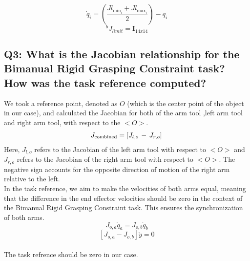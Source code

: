 \documentclass{article}
\begin{document}
\[
\dot{q}_i = \left(\frac{Jl_{\text{min}_i} + Jl_{\text{max}_i}}{2}\right) - q_i
\]
$${}^{b}J_{limit} =  \mathbf{I}_{14x14}$$

\subsection{Q3: What is the Jacobian relationship for the Bimanual Rigid Grasping Constraint task? How was the task reference computed?}

We took a reference point, denoted as  \( \mathit{O} \) (which is the center point of the object in our case), and calculated the Jacobian for both of the arm tool ,left arm tool and right arm tool, with respect to the  \( \mathit{<O>} \). \\
\[
J_{\text{combined}} = \left[ J_{l,o} \, - \, J_{r,o} \right]\\
\]
\noindent
Here, $J_{l,o}$ refers to the Jacobian of the left arm tool with respect to \( \mathit{<O>} \) and  $J_{r,o}$ refers to the Jacobian of the right arm tool with respect to \( \mathit{<O>} \). The negative sign accounts for the opposite direction of motion of the right arm relative to the left.\\
In the task reference, we aim to make the velocities of both arms equal, meaning that the difference in the end effector velocities should be zero in the context of the Bimanual Rigid Grasping Constraint task. This ensures the synchronization of both arms.\\
 
\[
{J}_{o,a} \dot{q}_a = {J}_{o,b} \dot{q}_b
\]
\[
[{J}_{o,a} - {J}_{o,b}]\dot{y}  = 0
\]\\
The task refrence should be zero in our case.
\end{document}
